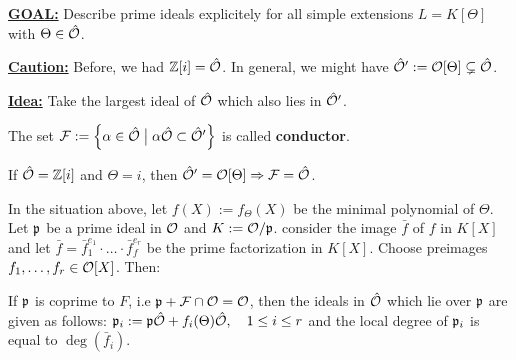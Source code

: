 \bigskip

\textbf{\underline{GOAL:}} Describe prime ideals explicitely for all simple extensions $L = K[\Theta]$ with $\Theta \in \hat{\mathcal{O}}$.

\textbf{\underline{Caution:}} Before, we had $\mathbb{Z}[i] = \hat{\mathcal{O}}$. In general, we might have $\hat{\mathcal{O}}' := \mathcal{O}[\Theta] \subsetneq \hat{\mathcal{O}}$.

\textbf{\underline{Idea:}} Take the largest ideal of $\hat{\mathcal{O}}$ which also lies in $\hat{\mathcal{O}}'$.

\begin{defi}
	The set $\mathcal{F} := \left\{ {\alpha \in \hat{\mathcal{O}}} \bigm| {\alpha\hat{\mathcal{O}} \subset \hat{\mathcal{O}}'} \right\}$ is called \textbf{conductor}.
\end{defi}

\begin{Bsp}
	If $\hat{\mathcal{O}} = \mathbb{Z}[i]$ and $\Theta = i$, then $\hat{\mathcal{O}}' = \mathcal{O}[\Theta] \Rightarrow \mathcal{F} = \hat{\mathcal{O}}$.
\end{Bsp}

\begin{Prop}
	In the situation above, let $f(X) := f_\Theta(X)$ be the minimal polynomial of $\Theta$. Let $\mathfrak{p}$ be a prime ideal in $\mathcal{O}$ and $K := \mathcal{O} / \mathfrak{p}$. consider the image $\bar f$ of $f$ in $K[X]$ and let $\bar f = \bar f_1^{e_1} \cdot \dots \cdot \bar f_f^{e_r}$ be the prime factorization in $K[X]$. Choose preimages $f_1, \dots, f_r \in \mathcal{O}[X]$. Then:
	
	If $\mathfrak{p}$ is coprime to $F$, i.e $\mathfrak{p} + \mathcal{F} \cap \mathcal{O} = \mathcal{O}$, then the ideals in $\hat{\mathcal{O}}$ which lie over $\mathfrak{p}$ are given as follows: $\mathfrak{p}_i := \mathfrak{p}\hat{\mathcal{O}} + f_i(\Theta) \hat{\mathcal{O}}, \quad 1 \leq i \leq r$ and the local degree of $\mathfrak{p}_i$ is equal to $\deg(\bar f_i)$.
\end{Prop}